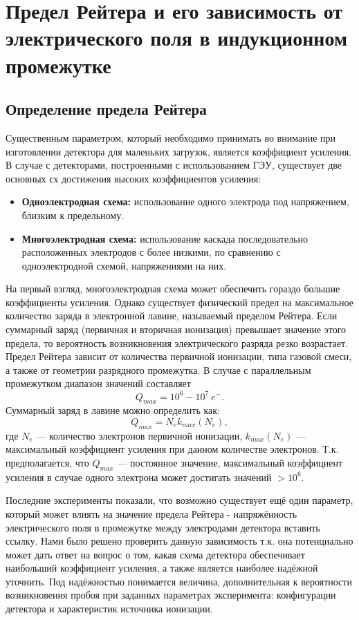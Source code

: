 \section{Предел Рейтера и его зависимость от электрического поля в индукционном промежутке}
\label{sec:raether_exp}
\subsection{Определение предела Рейтера}
Существенным параметром, который необходимо принимать во внимание при изготовлении детектора для маленьких загрузок, является коэффициент усиления. В случае с детекторами, построенными с использованием ГЭУ, существует две основных сх достижения высоких коэффициентов усиления: 
\begin{itemize}
	\item\textbf{Одноэлектродная схема:} использование одного электрода под напряжением, близким к предельному.
	\item\textbf{Многоэлектродная схема:} использование каскада последовательно расположенных электродов с более низкими, по сравнению с одноэлектродной схемой, напряжениями на них. 
\end{itemize}
\par На первый взгляд, многоэлектродная схема может обеспечить гораздо большие коэффициенты усиления. Однако существует физический предел на максимальное количество заряда в электронной лавине, называемый пределом Рейтера. Если суммарный заряд (первичная и вторичная ионизация) превышает значение этого предела, то вероятность возникновения электрического разряда резко возрастает. Предел Рейтера зависит от количества первичной ионизации, типа газовой смеси, а также от геометрии разрядного промежутка. 
В случае с параллельным промежутком диапазон значений составляет \cite{Peskov}
\begin{equation}
Q_{max} = 10^6-10^7~e^-.
\end{equation}
Суммарный заряд в лавине можно определить как: 
 \begin{equation}
 Q_{max} = N_e k_{max}(N_e),
 \label{Q(max)}
 \end{equation}
 где $N_e$ --- количество электронов первичной ионизации, $k_{max}(N_e)$ --- максимальный коэффициент усиления при данном количестве электронов. Т.к. предполагается, что $Q_{max}$ --- постоянное значение, максимальный коэффициент усиления в случае одного электрона может достигать значений $>10^6$. 
\par Последние эксперименты показали, что возможно существует ещё один параметр, который может влиять на значение предела Рейтера - напряжённость электрического поля в промежутке между электродами детектора {вставить ссылку}. Нами было решено проверить данную зависимость т.к. она потенциально может дать ответ на вопрос о том, какая схема детектора обеспечивает наибольший коэффициент усиления, а также является наиболее надёжной {уточнить}. Под надёжностью понимается величина, дополнительная к вероятности возникновения пробоя при заданных параметрах эксперимента: конфигурации детектора и характеристик источника ионизации. 
